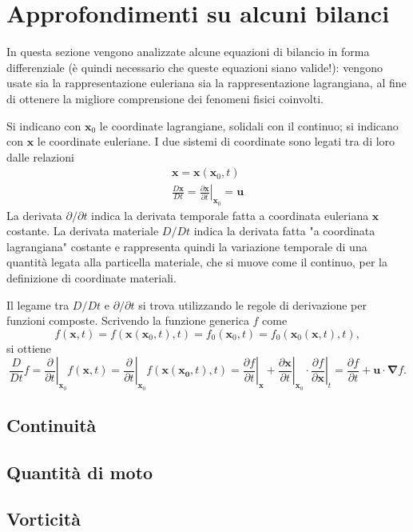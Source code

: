 \section{Approfondimenti su alcuni bilanci}

In questa sezione vengono analizzate alcune equazioni di bilancio
 in forma differenziale (è quindi necessario che queste equazioni siano
 valide!):
 vengono usate sia la rappresentazione euleriana sia la rappresentazione
 lagrangiana, al fine di ottenere la migliore comprensione dei fenomeni 
 fisici coinvolti.
 
Si indicano con $\bm{x}_0$ le coordinate lagrangiane, solidali con il 
 continuo; si indicano con $\bm{x}$ le coordinate euleriane.
I due sistemi di coordinate sono legati tra di loro dalle relazioni
\begin{equation}
\begin{aligned}
 \bm{x} = \bm{x}(\bm{x}_0,t) \\
 \frac{D \bm{x}}{D t} = \left.\frac{\partial \bm{x}}{\partial t}\right|_{\bm{x}_0} = 
 \bm{u}
\end{aligned}
\end{equation}
La derivata $\partial/\partial t$ indica la derivata temporale fatta
 a coordinata euleriana $\bm{x}$ costante. La derivata materiale 
 $D/D t$ indica la derivata fatta "a coordinata lagrangiana" costante
 e rappresenta quindi la variazione temporale di una quantità legata
 alla particella materiale, che si muove come il continuo, per la definizione
 di coordinate materiali.

\noindent
Il legame tra $D/Dt$ e $\partial/\partial t$ si trova utilizzando le
 regole di derivazione per funzioni composte. Scrivendo la funzione generica $f$ come
\begin{equation}
 f(\bm{x},t) = f(\bm{x}(\bm{x}_0,t),t)
  = f_0(\bm{x}_0,t) = f_0(\bm{x}_0(\bm{x},t),t) ,
\end{equation}
%
si ottiene
\begin{equation}
 \frac{D}{Dt} f = \left.\frac{\partial}{\partial t}\right|_{\bm{x}_0} f(\bm{x},t) =
   \left.\frac{\partial}{\partial t}\right|_{\bm{x}_0} f(\bm{x}(\bm{x_0},t),t) = 
   \left.\frac{\partial f}{\partial t}\right|_{\bm{x}} +
   \left.\frac{\partial \bm{x}}{\partial t}\right|_{\bm{x}_0} \cdot
   \left.\frac{\partial f}{\partial \bm{x}}\right|_{t}
   = \frac{\partial f}{\partial t} +
    \bm{u} \cdot \bm{\nabla} f .
\end{equation}





\subsection{Continuità}


\subsection{Quantità di moto}


\subsection{Vorticità}

 
